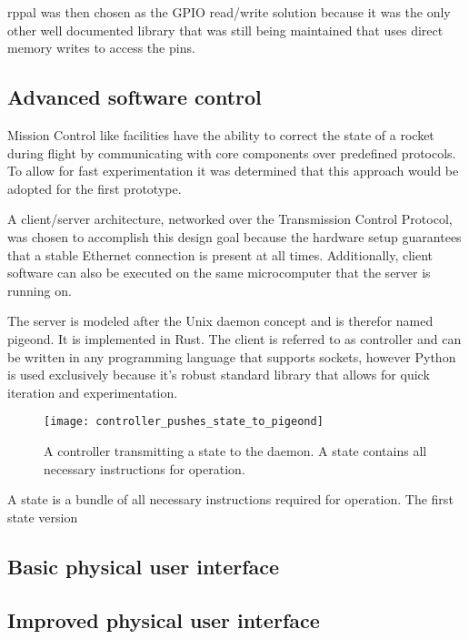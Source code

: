 rppal \cite{rppal} was then chosen as the GPIO read/write solution because it was the only other well documented library that was still being maintained that uses direct memory writes to access the pins.

\subsection{Advanced software control}
Mission Control like facilities have the ability to correct the state of a rocket during flight by communicating with core components over predefined protocols. To allow for fast experimentation it was determined that this approach would be adopted for the first prototype.

A client/server architecture, networked over the Transmission Control Protocol, was chosen to accomplish this design goal because the hardware setup guarantees that a stable Ethernet connection is present at all times. Additionally, client software can also be executed on the same microcomputer that the server is running on.

The server is modeled after the Unix daemon concept and is therefor named pigeond. It is implemented in Rust. The client is referred to as controller and can be written in any programming language that supports sockets, however Python is used exclusively because it's robust standard library that allows for quick iteration and experimentation.

\begin{figure}[h]
\centering

\texttt{[image: controller\_pushes\_state\_to\_pigeond]}

\caption{A controller transmitting a state to the daemon. A state contains all necessary instructions for operation.}
\end{figure}

A state is a bundle of all necessary instructions required for operation. The first state version 




\subsection{Basic physical user interface}

\subsection{Improved physical user interface}


